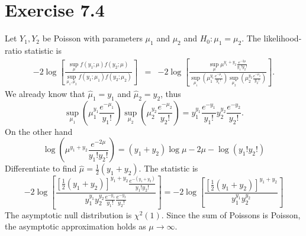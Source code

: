 \section*{Exercise 7.4}
Let $Y_{1},Y_{2}$ be Poisson with parameters $\mu_{1}$ and $\mu_{2}$
and $H_{0}:\mu_{1}=\mu_{2}$. The likelihood-ratio statistic is
\begin{eqnarray*}
-2\log\left[\frac{\sup_{\mu}f(y_{1};\mu)f(y_{2};\mu)}{\sup_{\mu_{1},\mu_{2}}f(y_{1};\mu_{1})f(y_{2};\mu_{2})}\right] & = & -2\log\left[\frac{\sup_{\mu}\mu^{y_{1}+y_{2}}\frac{e^{-2\mu}}{y_{1}!y_{2}!}}{\sup_{\mu_{1}}\left(\mu_{1}^{y_{1}}\frac{e^{-\mu_{1}}}{y_{1}!}\right)\sup_{\mu_{2}}\left(\mu_{2}^{y_{2}}\frac{e^{-\mu_{2}}}{y_{2}!}\right)}\right].
\end{eqnarray*}
We already know that $\hat{\mu}_{1}=y_{1}$ and $\hat{\mu}_{2}=y_{2}$,
thus 
\[
\sup_{\mu_{1}}\left(\mu_{1}^{y_{1}}\frac{e^{-\mu_{1}}}{y_{1}!}\right)\sup_{\mu_{2}}\left(\mu_{2}^{y_{2}}\frac{e^{-\mu_{2}}}{y_{2}!}\right)=y_{1}^{y_{1}}\frac{e^{-y_{1}}}{y_{1}!}y_{2}^{y_{2}}\frac{e^{-y_{2}}}{y_{2}!}.
\]
On the other hand
\[
\log\left(\mu^{y_{1}+y_{2}}\frac{e^{-2\mu}}{y_{1}!y_{2}!}\right)=(y_{1}+y_{2})\log\mu-2\mu-\log(y_{1}!y_{2}!)
\]
Differentiate to find $\hat{\mu}=\frac{1}{2}(y_{1}+y_{2})$. The statistic
is
\[
-2\log\left[\frac{\left[\frac{1}{2}(y_{1}+y_{2})\right]^{y_{1}+y_{2}}\frac{e^{-(y_{1}+y_{2})}}{y_{1}!y_{2}!}}{y_{1}^{y_{1}}y_{2}^{y_{2}}\frac{e^{-y_{1}}}{y_{1}!}\frac{e^{-y_{2}}}{y_{2}!}}\right]=-2\log\left[\frac{\left[\frac{1}{2}(y_{1}+y_{2})\right]^{y_{1}+y_{2}}}{y_{1}^{y_{1}}y_{2}^{y_{2}}}\right]
\]
The asymptotic null distribution is $\chi^{2}(1)$. Since the sum
of Poissons is Poisson, the asymptotic approximation holds as $\mu\to\infty$. 
